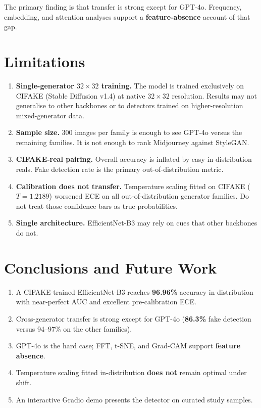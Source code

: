 \documentclass[12pt,a4paper]{article}
\begin{document}
The primary finding is that transfer is strong except for GPT-4o. Frequency, embedding, and attention analyses support a \textbf{feature-absence} account of that gap.

\section{Limitations}

\begin{enumerate}[noitemsep]
    \item \textbf{Single-generator $32\times32$ training.} The model is trained exclusively on CIFAKE (Stable Diffusion v1.4) at native $32\times32$ resolution. Results may not generalise to other backbones or to detectors trained on higher-resolution mixed-generator data.

    \item \textbf{Sample size.} 300 images per family is enough to see GPT-4o versus the remaining families. It is not enough to rank Midjourney against StyleGAN.

    \item \textbf{CIFAKE-real pairing.} Overall accuracy is inflated by easy in-distribution reals. Fake detection rate is the primary out-of-distribution metric.

    \item \textbf{Calibration does not transfer.} Temperature scaling fitted on CIFAKE ($T = 1.2189$) worsened ECE on all out-of-distribution generator families. Do not treat those confidence bars as true probabilities.

    \item \textbf{Single architecture.} EfficientNet-B3 may rely on cues that other backbones do not.
\end{enumerate}

\section{Conclusions and Future Work}

\begin{enumerate}[noitemsep]
    \item A CIFAKE-trained EfficientNet-B3 reaches \textbf{96.96\%} accuracy in-distribution with near-perfect AUC and excellent pre-calibration ECE.
    \item Cross-generator transfer is strong except for GPT-4o (\textbf{86.3\%} fake detection versus 94--97\% on the other families).
    \item GPT-4o is the hard case; FFT, t-SNE, and Grad-CAM support \textbf{feature absence}.
    \item Temperature scaling fitted in-distribution \textbf{does not} remain optimal under shift.
    \item An interactive Gradio demo presents the detector on curated study samples.
\end{enumerate}
\end{document}
